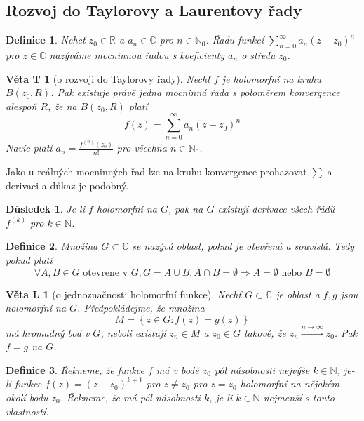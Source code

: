 \documentclass[11pt,a4paper]{article}
\newcounter{vety}
\newtheorem*{definice}{Definice}
\newtheorem{vetal}[vety]{Věta L}
\newtheorem{vetat}[vety]{Věta T}
\newtheorem*{dusledek}{Důsledek}
\begin{document}
\subsection{Rozvoj do Taylorovy a Laurentovy řady}

\begin{definice}
Nehcť $z_0 \in \mathbb{R}$ a $a_n \in \mathbb{C}$ pro $n \in \mathbb{N}_0$. Řadu funkcí $\sum_{n=0}^{\infty} a_n (z-z_0)^n$ pro $z \in \mathbb{C}$ nazýváme mocninnou řadou s koeficienty $a_n$ o středu $z_0$.
\end{definice}

\begin{vetat}[o rozvoji do Taylorovy řady]
Nechť $f$ je holomorfní na kruhu $B(z_0, R)$. Pak existuje právě jedna mocninná řada s poloměrem konvergence alespoň $R$, že na $B(z_0, R)$ platí
$$f(z) = \sum_{n=0}^\infty a_n (z-z_0)^n$$
Navíc platí $a_n = \frac{f^{(n)}(z_0)}{n!}$ pro všechna $n \in \mathbb{N}_0$.
\end{vetat}

Jako u reálných mocninných řad lze na kruhu konvergence prohazovat $\sum$ a derivaci a důkaz je podobný.

\begin{dusledek}
Je-li $f$ holomorfní na $G$, pak na $G$ existují derivace všech řádů $f^{(k)}$ pro $k \in \mathbb{N}$.
\end{dusledek}

\begin{definice}
Množina $G \subset \mathbb{C}$ se nazývá \emph{oblast}, pokud je otevřená a souvislá. Tedy pokud platí
$$\forall A, B \in G \textrm{ otevrene v } G, G=A \cup B, A \cap B = \emptyset \Rightarrow A = \emptyset \textrm{ nebo } B = \emptyset$$
\end{definice}

\begin{vetal}[o jednoznačnosti holomorfní funkce]
Nechť $G \subset \mathbb{C}$ je oblast a $f, g$ jsou holomorfní na $G$. Předpokládejme, že množina
$$M = \left\{ z \in G : f(z)=g(z) \right\} $$
má hromadný bod v $G$, neboli existují $z_n \in M$ a $z_0 \in G$ takové, že $z_n \stackrel{n \rightarrow \infty}{\rightarrow} z_0$. Pak $f=g$ na $G$.
\end{vetal}

\begin{definice}
Řekneme, že funkce $f$ má v bodě $z_0$ pól násobnosti nejvýše $k \in \mathbb{N}$, je-li funkce $f(z) = (z-z_0)^{k+1}$ pro $z \neq z_0$ pro $z = z_0$ holomorfní na nějakém okolí bodu $z_0$. Řekneme, že má pól násobnosti $k$, je-li $k \in \mathbb{N}$ nejmenší s touto vlastností.
\end{definice}
\end{document}
